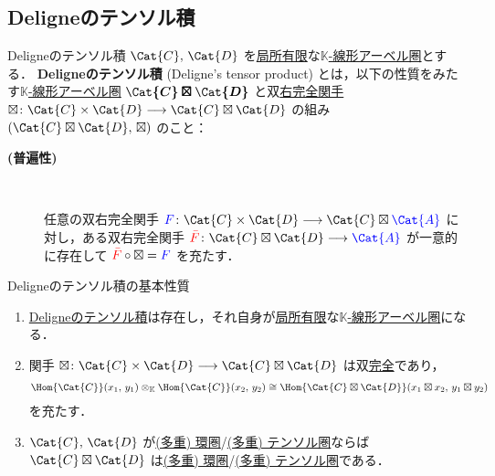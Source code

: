 \documentclass[TQFT_main]{subfiles}
\begin{document}
\subsection{Deligneのテンソル積}

\begin{mydef}[label=def:DeligneProduct]{Deligneのテンソル積}
    $\Cat{C},\, \Cat{D}$ を\hyperref[def:finite-abcat]{局所有限}な\hyperref[def:additive-cat]{$\mathbb{K}$-線形アーベル圏}とする．
    \textbf{Deligneのテンソル積} (Deligne's tensor product) とは，以下の性質をみたす\hyperref[def:additive-cat]{$\mathbb{K}$-線形アーベル圏} $\bm{\Cat{C} \boxtimes \Cat{D}}$ と双\hyperref[def:additive-exact]{右完全関手} $\boxtimes \colon \Cat{C} \times \Cat{D} \lto \Cat{C} \boxtimes \Cat{D}$ の組み $(\Cat{C} \boxtimes \Cat{D},\, \boxtimes)$ のこと：
    \begin{description}
        \item[\textbf{(普遍性)}]　
        
        任意の双右完全関手 $\textcolor{blue}{F} \colon \Cat{C} \times \Cat{D} \lto \Cat{C} \boxtimes \textcolor{blue}{\Cat{A}}$ に対し，ある双右完全関手 $\textcolor{red}{\bar{F}} \colon \Cat{C} \boxtimes \Cat{D} \lto \textcolor{blue}{\Cat{A}}$ が一意的に存在して $\textcolor{red}{\bar{F}} \circ \boxtimes = \textcolor{blue}{F}$ を充たす．
    \end{description}
    
\end{mydef}

\begin{myprop}[label=prop:DeligneProduct]{Deligneのテンソル積の基本性質}
    \begin{enumerate}
        \item \hyperref[def:DeligneProduct]{Deligneのテンソル積}は存在し，それ自身が\hyperref[def:finite-abcat]{局所有限}な\hyperref[def:additive-cat]{$\mathbb{K}$-線形アーベル圏}になる．
        \item 関手 $\boxtimes \colon \Cat{C} \times \Cat{D} \lto \Cat{C} \boxtimes \Cat{D}$ は双\hyperref[def:additive-exact]{完全}であり，
        \begin{align}
            \Hom{\Cat{C}} (x_1,\, y_1) \otimes_{\mathbb{K}} \Hom{\Cat{C}} (x_2,\, y_2) \cong \Hom{\Cat{C} \boxtimes \Cat{D}} (x_1 \boxtimes x_2,\, y_1 \boxtimes y_2)
        \end{align}
        を充たす．
        \item $\Cat{C},\, \Cat{D}$ が\hyperref[def:ringcat]{(多重) 環圏}/\hyperref[def:tensorfusion-cat]{(多重) テンソル圏}ならば $\Cat{C} \boxtimes \Cat{D}$ は\hyperref[def:ringcat]{(多重) 環圏}/\hyperref[def:tensorfusion-cat]{(多重) テンソル圏}である．
    \end{enumerate}
    
\end{myprop}
\end{document}
